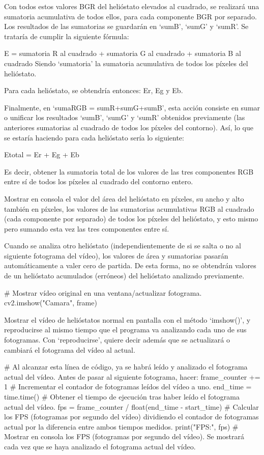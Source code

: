 \documentclass[12pt]{article}
\begin{document}
Con todos estos valores BGR del helióstato elevados al cuadrado, se realizará una sumatoria acumulativa de todos ellos, para cada componente BGR por separado. Los resultados de las sumatorias se guardarán en ‘sumB’, ‘sumG’ y ‘sumR’. Se trataría de cumplir la siguiente fórmula:

E = sumatoria R al cuadrado + sumatoria G al cuadrado + sumatoria B al cuadrado
Siendo ‘sumatoria’ la sumatoria acumulativa de todos los píxeles del helióstato.

Para cada helióstato, se obtendría entonces: Er, Eg y Eb.
           
Finalmente, en ‘sumaRGB = sumR+sumG+sumB’, esta acción consiste en sumar o unificar los resultados ‘sumB’, ‘sumG’ y ‘sumR’ obtenidos previamente (las anteriores sumatorias al cuadrado de todos los píxeles del contorno). Así, lo que se estaría haciendo para cada helióstato sería lo siguiente:

Etotal = Er + Eg + Eb

Es decir, obtener la sumatoria total de los valores de las tres componentes RGB entre sí de todos los píxeles al cuadrado del contorno entero.

Mostrar en consola el valor del área del helióstato en píxeles, su ancho y alto también en píxeles, los valores de las sumatorias acumulativas RGB al cuadrado (cada componente por separado) de todos los píxeles del helióstato, y esto mismo pero sumando esta vez las tres componentes entre sí.

Cuando se analiza otro helióstato (independientemente de si se salta o no al siguiente fotograma del vídeo), los valores de área y sumatorias pasarán automáticamente a valer cero de partida. De esta forma, no se obtendrán valores de un helióstato acumulados (erróneos) del helióstato analizado previamente.


\# Mostrar vídeo original en una ventana/actualizar fotograma.
cv2.imshow("Camara", frame)

Mostrar el vídeo de helióstatos normal en pantalla con el método ‘imshow()’, y reproducirse al mismo tiempo que el programa va analizando cada uno de sus fotogramas. Con ‘reproducirse’, quiere decir además que se actualizará o cambiará el fotograma del vídeo al actual.


\# Al alcanzar esta línea de código, ya se habrá leído y analizado el fotograma actual del vídeo. Antes de pasar al siguiente fotograma, hacer:
    frame\_counter += 1 \# Incrementar el contador de fotogramas leídos del vídeo a uno.
    end\_time = time.time() \# Obtener el tiempo de ejecución tras haber leído el fotograma actual del vídeo.
    fps = frame\_counter / float(end\_time - start\_time) \# Calcular los FPS (fotogramas por segundo del vídeo) dividiendo el contador de fotogramas actual por la diferencia entre ambos tiempos medidos.
    print("FPS:", fps) \# Mostrar en consola los FPS (fotogramas por segundo del vídeo). Se mostrará cada vez que se haya analizado el fotograma actual del vídeo.
\end{document}
